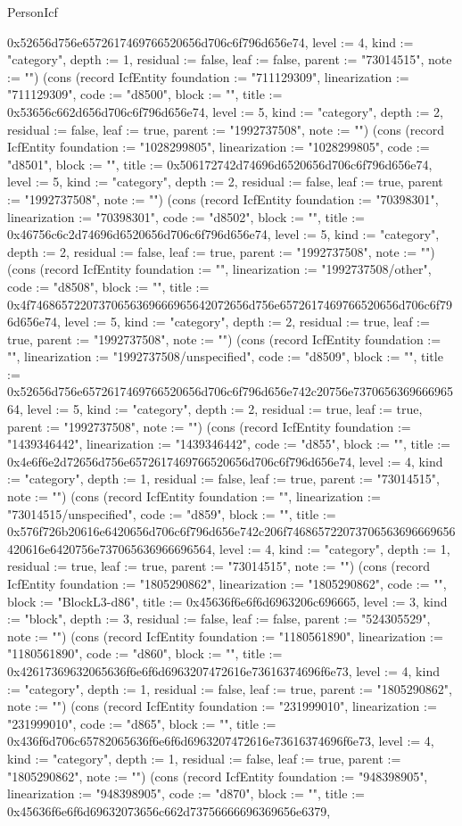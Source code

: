 \begin{lexlean}{PersonIcf}
\begin{semanticmodule}
{0x52656d756e6572617469766520656d706c6f796d656e74, level := 4, kind := "category", depth := 1, residual := false, leaf := false, parent := "73014515", note := ""}) (cons (record IcfEntity {foundation := "711129309", linearization := "711129309", code := "d8500", block := "", title := 0x53656c662d656d706c6f796d656e74, level := 5, kind := "category", depth := 2, residual := false, leaf := true, parent := "1992737508", note := ""}) (cons (record IcfEntity {foundation := "1028299805", linearization := "1028299805", code := "d8501", block := "", title := 0x506172742d74696d6520656d706c6f796d656e74, level := 5, kind := "category", depth := 2, residual := false, leaf := true, parent := "1992737508", note := ""}) (cons (record IcfEntity {foundation := "70398301", linearization := "70398301", code := "d8502", block := "", title := 0x46756c6c2d74696d6520656d706c6f796d656e74, level := 5, kind := "category", depth := 2, residual := false, leaf := true, parent := "1992737508", note := ""}) (cons (record IcfEntity {foundation := "", linearization := "1992737508/other", code := "d8508", block := "", title := 0x4f74686572207370656369666965642072656d756e6572617469766520656d706c6f796d656e74, level := 5, kind := "category", depth := 2, residual := true, leaf := true, parent := "1992737508", note := ""}) (cons (record IcfEntity {foundation := "", linearization := "1992737508/unspecified", code := "d8509", block := "", title := 0x52656d756e6572617469766520656d706c6f796d656e742c20756e737065636966696564, level := 5, kind := "category", depth := 2, residual := true, leaf := true, parent := "1992737508", note := ""}) (cons (record IcfEntity {foundation := "1439346442", linearization := "1439346442", code := "d855", block := "", title := 0x4e6f6e2d72656d756e6572617469766520656d706c6f796d656e74, level := 4, kind := "category", depth := 1, residual := false, leaf := true, parent := "73014515", note := ""}) (cons (record IcfEntity {foundation := "", linearization := "73014515/unspecified", code := "d859", block := "", title := 0x576f726b20616e6420656d706c6f796d656e742c206f746865722073706563696669656420616e6420756e737065636966696564, level := 4, kind := "category", depth := 1, residual := true, leaf := true, parent := "73014515", note := ""}) (cons (record IcfEntity {foundation := "1805290862", linearization := "1805290862", code := "", block := "BlockL3-d86", title := 0x45636f6e6f6d6963206c696665, level := 3, kind := "block", depth := 3, residual := false, leaf := false, parent := "524305529", note := ""}) (cons (record IcfEntity {foundation := "1180561890", linearization := "1180561890", code := "d860", block := "", title := 0x42617369632065636f6e6f6d6963207472616e73616374696f6e73, level := 4, kind := "category", depth := 1, residual := false, leaf := true, parent := "1805290862", note := ""}) (cons (record IcfEntity {foundation := "231999010", linearization := "231999010", code := "d865", block := "", title := 0x436f6d706c65782065636f6e6f6d6963207472616e73616374696f6e73, level := 4, kind := "category", depth := 1, residual := false, leaf := true, parent := "1805290862", note := ""}) (cons (record IcfEntity {foundation := "948398905", linearization := "948398905", code := "d870", block := "", title := 0x45636f6e6f6d69632073656c662d73756666696369656e6379, }
\end{semanticmodule}
\end{lexlean}
